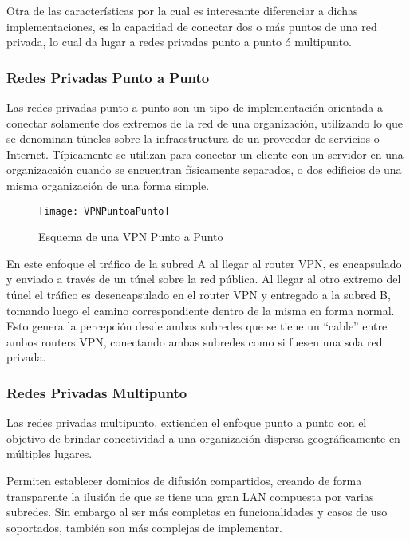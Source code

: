 Otra de las características por la cual es interesante diferenciar a dichas implementaciones, es la capacidad de conectar dos o m\'as puntos de una red privada, lo cual da lugar a redes privadas punto a punto \'o multipunto.

\subsubsection{Redes Privadas Punto a Punto}

Las redes privadas punto a punto son un tipo de implementaci\'on orientada a conectar solamente dos extremos de la red de una organizaci\'on, utilizando lo que se denominan t\'uneles sobre la infraestructura de un proveedor de servicios o Internet. T\'ipicamente se utilizan para conectar un cliente con un servidor en una organizacai\'on cuando se encuentran f\'isicamente separados, o dos edificios de una misma organizaci\'on de una forma simple. 

\begin{figure}[htbp!] 
\centering    
\texttt{[image: VPNPuntoaPunto]}
\caption[Esquema de una VPN Punto a Punto]{Esquema de una VPN Punto a Punto}
\label{fig:VPNPuntoAPunto}
\end{figure}

En este enfoque el tr\'afico de la subred A al llegar al router VPN, es encapsulado y enviado a trav\'es de un túnel sobre la red p\'ublica. Al llegar al otro extremo del túnel el tr\'afico es desencapsulado en el router VPN y entregado a la subred B, tomando luego el camino correspondiente dentro de la misma en forma normal. Esto genera la percepci\'on desde ambas subredes que se tiene un “cable” entre ambos routers VPN, conectando ambas subredes como si fuesen una sola red privada.
 
\subsubsection{Redes Privadas Multipunto}

Las redes privadas multipunto, extienden el enfoque punto a punto con el objetivo de brindar conectividad a una organizaci\'on dispersa geogr\'aficamente en m\'ultiples lugares.

Permiten establecer dominios de difusi\'on compartidos, creando de forma transparente la ilusi\'on de que se tiene una gran LAN compuesta por varias subredes. Sin embargo al ser m\'as completas en funcionalidades y casos de uso soportados, tambi\'en son m\'as complejas de implementar.\\ 

